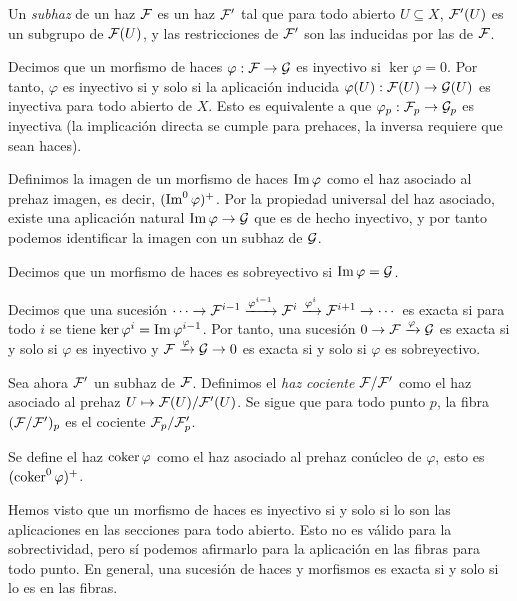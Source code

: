 \documentclass[GA.tex]{subfiles}
\begin{document}
\begin{defi}
Un \emph{subhaz} de un haz $\mathcal{F}$ es un haz $\mathcal{F}'$ tal que para todo abierto $U\subseteq X$, $\mathcal{F}'(U)$ es un subgrupo de $\mathcal{F}(U)$, y las restricciones de $\mathcal{F}'$ son las inducidas por las de $\mathcal{F}$. 

Decimos que un morfismo de haces $\varphi:\mathcal{F}\to\mathcal{G}$ es inyectivo si $\ker\varphi=0$. Por tanto, $\varphi$ es inyectivo si y solo si la aplicación inducida $\varphi(U):\mathcal{F}(U)\to\mathcal{G}(U)$ es inyectiva para todo abierto de $X$. Esto es equivalente a que $\varphi_p:\mathcal{F}_p\to \mathcal{G}_p$ es inyectiva (la implicación directa se cumple para prehaces, la inversa requiere que sean haces). 

Definimos la imagen de un morfismo de haces $\operatorname{Im}\varphi$ como el haz asociado al prehaz imagen, es decir, $(\operatorname{Im}^0\varphi)^+$. Por la propiedad universal del haz asociado, existe una aplicación natural $\operatorname{Im}\varphi\to\mathcal{G}$ que es de hecho inyectivo, y por tanto podemos identificar la imagen con un subhaz de $\mathcal{G}$. 

Decimos que un morfismo de haces es sobreyectivo si $\operatorname{Im}\varphi=\mathcal{G}$.

Decimos que una sucesión $\cdots\to\mathcal{F}^{i-1}\xrightarrow{\varphi^{i-1}}\mathcal{F}^i\xrightarrow{\varphi^i}\mathcal{F}^{i+1}\to\cdots$ es exacta si para todo $i$ se tiene $\ker\varphi^i=\operatorname{Im}\varphi^{i-1}$. Por tanto, una sucesión $0\to\mathcal{F}\xrightarrow{\varphi}\mathcal{G}$ es exacta si y solo si $\varphi$ es inyectivo y $\mathcal{F}\xrightarrow{\varphi}\mathcal{G}\to 0$ es exacta si y solo si $\varphi$ es sobreyectivo. 

Sea ahora $\mathcal{F}'$ un subhaz de $\mathcal{F}$. Definimos el \emph{haz cociente} $\mathcal{F}/\mathcal{F}'$ como el haz asociado al prehaz $U\mapsto \mathcal{F}(U)/\mathcal{F}'(U)$. Se sigue que para todo punto $p$, la fibra $(\mathcal{F}/\mathcal{F}')_p$ es el cociente $\mathcal{F}_p/\mathcal{F}'_p$.

Se define el haz $\operatorname{coker}\varphi$ como el haz asociado al prehaz conúcleo de $\varphi$, esto es $(\operatorname{coker}^0\varphi)^+$. 
\end{defi}

\begin{nota}
Hemos visto que un morfismo de haces es inyectivo si y solo si lo son las aplicaciones en las secciones para todo abierto. Esto no es válido para la sobrectividad, pero sí podemos afirmarlo para la aplicación en las fibras para todo punto. En general, una sucesión de haces y morfismos es exacta si y solo si lo es en las fibras. 
\end{nota}
\end{document}
